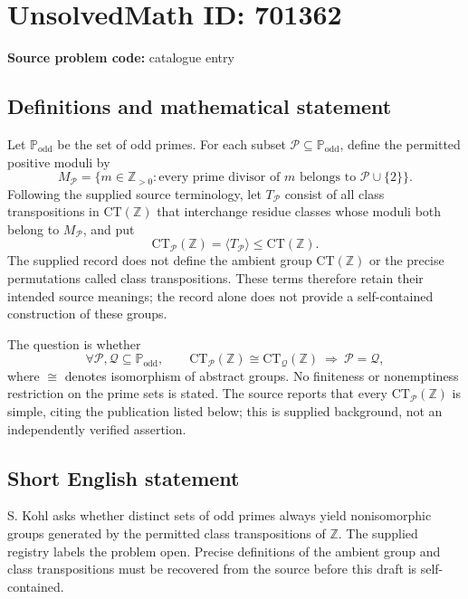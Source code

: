 \documentclass[11pt]{article}
\newcommand{\Z}{\mathbb{Z}}
\begin{document}
\section*{UnsolvedMath ID: 701362}
\textbf{Source problem code:} catalogue entry
\subsection{Definitions and mathematical statement}
Let \(\mathbb P_{\mathrm{odd}}\) be the set of odd primes. For each subset \(\mathcal P\subseteq\mathbb P_{\mathrm{odd}}\), define the permitted positive moduli by
\[
M_{\mathcal P}=\{m\in\Z_{>0}:\text{every prime divisor of }m\text{ belongs to }\mathcal P\cup\{2\}\}.
\]
Following the supplied source terminology, let \(T_{\mathcal P}\) consist of all class transpositions in \(\mathrm{CT}(\Z)\) that interchange residue classes whose moduli both belong to \(M_{\mathcal P}\), and put
\[
\mathrm{CT}_{\mathcal P}(\Z)=\langle T_{\mathcal P}\rangle\leq\mathrm{CT}(\Z).
\]
The supplied record does not define the ambient group \(\mathrm{CT}(\Z)\) or the precise permutations called class transpositions. These terms therefore retain their intended source meanings; the record alone does not provide a self-contained construction of these groups.

The question is whether
\[
\forall\mathcal P,\mathcal Q\subseteq\mathbb P_{\mathrm{odd}},\qquad
\mathrm{CT}_{\mathcal P}(\Z)\cong\mathrm{CT}_{\mathcal Q}(\Z)
\ \Longrightarrow\ \mathcal P=\mathcal Q,
\]
where \(\cong\) denotes isomorphism of abstract groups. No finiteness or nonemptiness restriction on the prime sets is stated. The source reports that every \(\mathrm{CT}_{\mathcal P}(\Z)\) is simple, citing the publication listed below; this is supplied background, not an independently verified assertion.
\subsection{Short English statement}
S. Kohl asks whether distinct sets of odd primes always yield nonisomorphic groups generated by the permitted class transpositions of \(\Z\). The supplied registry labels the problem open. Precise definitions of the ambient group and class transpositions must be recovered from the source before this draft is self-contained.
\end{document}
